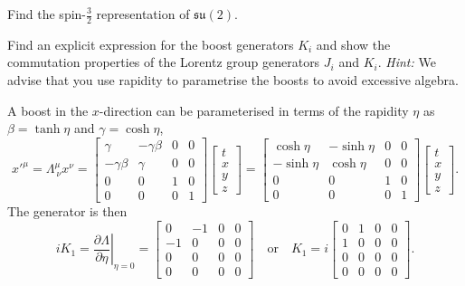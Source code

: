 \documentclass[notes.tex]{subfiles}
\begin{document}
\begin{Exercise}[]
Find the spin-$\frac{3}{2}$ representation of $\mathfrak{su}(2)$.
\end{Exercise}


\begin{Exercise}[label=ex:boost_generators]
Find an explicit expression for the boost generators $K_i$ and show the commutation properties of the Lorentz group generators $J_i$ and $K_i$. {\it Hint:} We advise that you use rapidity to parametrise the boosts to avoid excessive algebra.
\end{Exercise}

\begin{Answer} 
A boost in the $x$-direction can be parameterised in terms of the rapidity $\eta$ as $\beta=\tanh\eta$ and $\gamma=\cosh \eta$,
\[ x'^\mu=\Lambda^\mu_{~\nu}x^\nu
=\left[\begin{matrix} \gamma & -\gamma\beta  & 0 &  0\\  -\gamma\beta & \gamma & 0 & 0 \\  0 & 0 & 1 & 0 \\ 0 & 0 & 0 & 1 \end{matrix}\right] \left[\begin{matrix}  t\\ x\\ y \\ z \end{matrix}\right]
=\left[\begin{matrix} \cosh\eta & -\sinh\eta  & 0 &  0\\  -\sinh\eta & \cosh \eta & 0 & 0 \\  0 & 0 & 1 & 0 \\ 0 & 0 & 0 & 1 \end{matrix}\right] \left[\begin{matrix}  t\\ x\\ y \\ z \end{matrix}\right]. \]
The generator is then
\[ iK_1 = \left. \frac{\partial \Lambda}{\partial \eta}\right|_{\eta=0} = 
\left[\begin{matrix} 0 & -1  & 0 &  0\\  -1 & 0 & 0 & 0 \\  0 & 0 & 0 & 0 \\ 0 & 0 & 0 & 0 \end{matrix}\right]\quad\text{or}\quad  K_1 = i \left[\begin{matrix} 0 & 1  & 0 &  0\\  1 & 0 & 0 & 0 \\  0 & 0 & 0 & 0 \\ 0 & 0 & 0 & 0 \end{matrix}\right].\]

\end{Answer}
\end{document}
